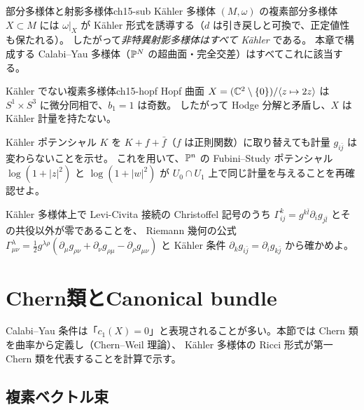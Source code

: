 \begin{myex}{部分多様体と射影多様体}{ch15-sub}
K\"ahler 多様体 $(M,\omega)$ の複素部分多様体 $X\subset M$ には $\omega|_X$ が K\"ahler 形式を誘導する（$d$ は引き戻しと可換で、正定値性も保たれる）。
したがって\emph{非特異射影多様体はすべて K\"ahler} である。
本章で構成する Calabi--Yau 多様体（$\mathbb{P}^N$ の超曲面・完全交差）はすべてこれに該当する。
\end{myex}

\begin{myex}{K\"ahler でない複素多様体}{ch15-hopf}
Hopf 曲面 $X = (\mathbb{C}^2\setminus\{0\})/\langle z\mapsto 2z\rangle$ は $S^1\times S^3$ に微分同相で、$b_1 = 1$ は奇数。
したがって Hodge 分解と矛盾し、$X$ は K\"ahler 計量を持たない。
\end{myex}

K\"ahler ポテンシャル $K$ を $K + f + \bar f$（$f$ は正則関数）に取り替えても計量 $g_{i\bar j}$ は変わらないことを示せ。
これを用いて、$\mathbb{P}^n$ の Fubini--Study ポテンシャル $\log(1+|z|^2)$ と $\log(1+|w|^2)$ が $U_0\cap U_1$ 上で同じ計量を与えることを再確認せよ。

K\"ahler 多様体上で Levi-Civita 接続の Christoffel 記号のうち $\Gamma^k_{ij} = g^{k\bar l}\partial_ig_{j\bar l}$ とその共役以外が零であることを、
Riemann 幾何の公式 $\Gamma^\lambda_{\mu\nu} = \frac12 g^{\lambda\rho}(\partial_\mu g_{\rho\nu}+\partial_\nu g_{\rho\mu}-\partial_\rho g_{\mu\nu})$ と K\"ahler 条件 $\partial_kg_{i\bar j} = \partial_ig_{k\bar j}$ から確かめよ。

\section{Chern類とCanonical bundle}

Calabi--Yau 条件は「$c_1(X)=0$」と表現されることが多い。本節では Chern 類を曲率から定義し（Chern--Weil 理論）、
K\"ahler 多様体の Ricci 形式が第一 Chern 類を代表することを計算で示す。

\subsection{複素ベクトル束}

